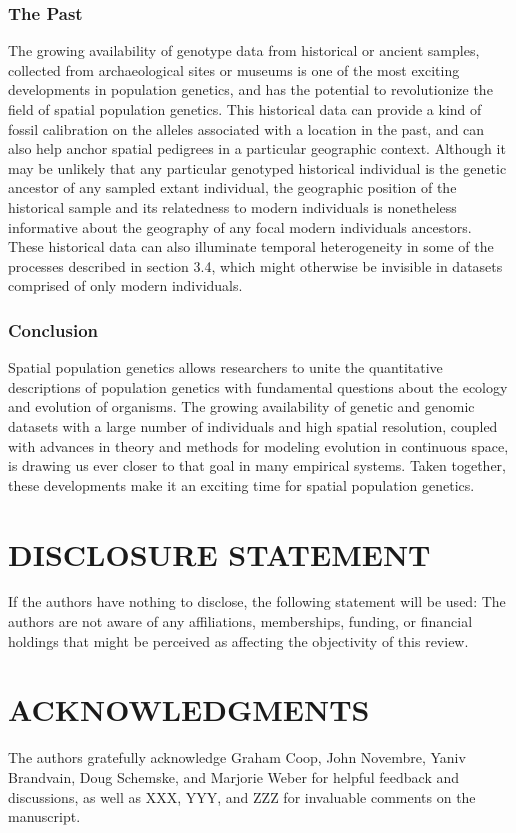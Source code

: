 \documentclass{ar-1col}
\begin{document}
\subsubsection{The Past} 
The growing availability of genotype data from historical or ancient samples, 
collected from archaeological sites or museums 
is one of the most exciting developments in population genetics, 
and has the potential to revolutionize the field of spatial population genetics.
This historical data can provide a kind of fossil calibration on 
the alleles associated with a location in the past, 
and can also help anchor spatial pedigrees in a particular geographic context.
Although it may be unlikely that any particular genotyped historical individual 
is the genetic ancestor of any sampled extant individual, 
the geographic position of the historical sample and its 
relatedness to modern individuals is nonetheless informative 
about the geography of any focal modern individuals ancestors.
These historical data can also illuminate temporal heterogeneity 
in some of the processes described in section 3.4, 
which might otherwise be invisible in datasets comprised of only modern individuals.

\subsubsection{Conclusion}

Spatial population genetics allows researchers to 
unite the quantitative descriptions of population genetics 
with fundamental questions about the ecology and evolution of organisms.
The growing availability of genetic and genomic datasets 
with a large number of individuals and high spatial resolution, 
coupled with advances in theory and methods 
for modeling evolution in continuous space, 
is drawing us ever closer to that goal in many empirical systems.
Taken together, these developments make it 
an exciting time for spatial population genetics.



\section*{DISCLOSURE STATEMENT}
If the authors have nothing to disclose, the following statement will be used: 
The authors are not aware of any affiliations, memberships, funding, or financial holdings 
that might be perceived as affecting the objectivity of this review.

\section*{ACKNOWLEDGMENTS}
The authors gratefully acknowledge 
Graham Coop, John Novembre, 
Yaniv Brandvain, Doug Schemske, and Marjorie Weber 
for helpful feedback and discussions, 
as well as XXX, YYY, and ZZZ for invaluable comments on the manuscript.



\end{document}
